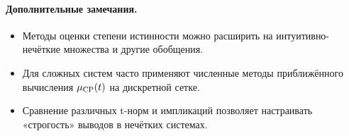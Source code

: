 \paragraph{Дополнительные замечания.}
\begin{itemize}
  \item Методы оценки степени истинности можно расширить на интуитивно-нечёткие множества и другие обобщения.
  \item Для сложных систем часто применяют численные методы приближённого вычисления $\mu_{\operatorname{CP}}(t)$ на дискретной сетке.
  \item Сравнение различных t-норм и импликаций позволяет настраивать «строгость» выводов в нечётких системах.
\end{itemize}
%
%
%
